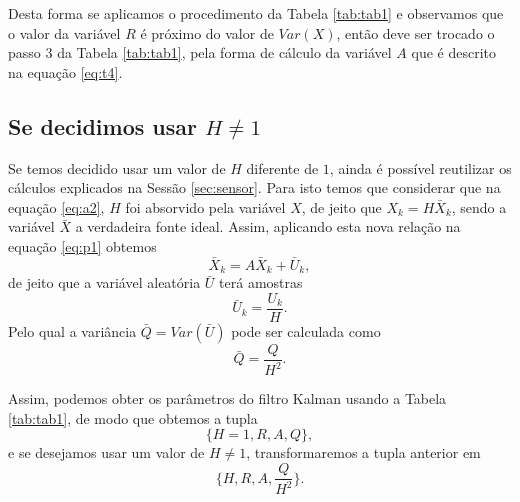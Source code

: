 \documentclass[a4paper,10pt]{article}
\begin{document}
Desta forma se aplicamos o procedimento da Tabela \ref{tab:tab1} e observamos 
que o valor da variável $R$ é próximo do valor de $Var(X)$,
então deve ser trocado o passo 3 da Tabela \ref{tab:tab1}, pela forma de cálculo
da variável  $A$ que é descrito na equação \eqref{eq:t4}.

\subsection{Se decidimos usar $H \neq 1$ } \label{sec:H}

Se temos decidido usar um valor de $H$ diferente de $1$, ainda é possível reutilizar
os cálculos explicados na Sessão \ref{sec:sensor}.
Para isto temos que considerar que na equação \eqref{eq:a2}, $H$ foi absorvido pela variável $X$,
de jeito que $X_{k}=H \bar{X}_{k}$, sendo a variável $\bar{X}$ a verdadeira fonte ideal.
Assim, aplicando esta nova relação na equação \eqref{eq:p1} obtemos
\begin{equation} \label{eq:t6}
\bar{X}_{k}=A \bar{X}_{k}+ \bar{U}_k,
\end{equation}
de jeito que a variável aleatória $\bar{U}$ terá amostras
\begin{equation} \label{eq:t7}
\bar{U}_k=\frac{U_k}{H}.
\end{equation}
Pelo qual a variância $\bar{Q}=Var(\bar{U})$ pode ser calculada como
\begin{equation} \label{eq:t8}
\bar{Q}=\frac{Q}{H^2}.
\end{equation}

Assim, podemos obter os parâmetros do filtro Kalman usando a Tabela \ref{tab:tab1},
de modo que obtemos a tupla 
\begin{equation} \label{eq:t9}
\{H=1,R,A,Q\},
\end{equation}
e se desejamos usar um valor de $H \neq 1$, transformaremos a tupla anterior em
\begin{equation} \label{eq:t10}
\{H,R,A,\frac{Q}{H^2}\}.
\end{equation}




\end{document}
